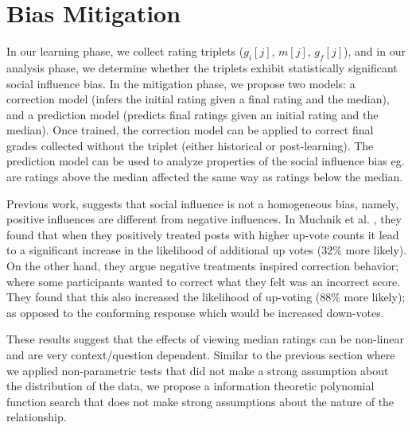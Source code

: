 \section{Bias Mitigation}
\label{changemod}
In our learning phase, we collect rating triplets ($g_i[j]$, $m[j]$, $g_f[j]$), and in our analysis phase, we determine whether the triplets exhibit statistically significant social influence bias. 
In the mitigation phase, we propose two models: a correction model (infers the initial rating given a final rating and the median), and a prediction model (predicts final ratings given an initial rating and the median).
Once trained, the correction model can be applied to correct final grades collected without the triplet (either historical or post-learning).
The prediction model can be used to analyze properties of the social influence bias eg. are ratings above the median affected the same way as ratings below the median.

Previous work, suggests that social influence is not a homogeneous bias, namely, positive influences are different from negative influences.
In Muchnik et al. \cite{muchnik2013social}, they found that when they positively treated posts with higher up-vote counts it lead to a significant increase in the likelihood of additional up votes (32\% more likely). 
On the other hand, they argue negative treatments inspired correction behavior; where some participants wanted to correct what they felt was an incorrect score. 
They found that this also increased the likelihood of up-voting (88\% more likely); as opposed to the conforming response which would be increased down-votes.

These results suggest that the effects of viewing median ratings can be non-linear and are very context/question dependent.
Similar to the previous section where we applied non-parametric tests that did not make a strong assumption about the distribution of the data, we propose a information theoretic polynomial function search that does not make strong assumptions about the nature of the relationship.

